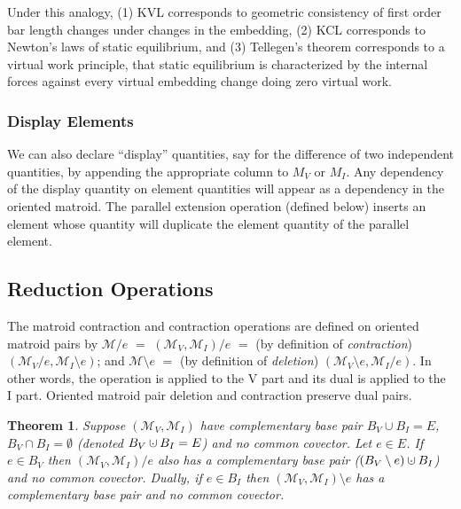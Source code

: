 \documentclass{amsproc-sunycstr}
\theoremstyle{plain}
\newtheorem{theorem}{Theorem}
\theoremstyle{definition}
\theoremstyle{remark}
\newcommand{\dunion}
{\mbox{\hbox{\hskip4pt$\cdot$\hskip-4.62pt$\cup$\hskip2pt}}}
\begin{document}
Under this analogy, 
(1) KVL corresponds to geometric consistency of first order
bar length changes under changes in the embedding, (2) KCL corresponds to
Newton's laws of static equilibrium, and (3) Tellegen's theorem corresponds
to a virtual work principle, that static equilibrium is
characterized by 
the internal forces against every virtual embedding change 
doing zero virtual work.

\subsubsection{Display Elements}
We can also declare ``display'' quantities, say for the difference of two
independent quantities, by appending the appropriate column to $M_V$ or
$M_I$.  Any dependency of the display quantity on element quantities will
appear as a dependency in the oriented matroid.  The parallel extension 
operation (defined below) inserts an element whose quantity will duplicate
the element quantity of the parallel element.




\subsection{Reduction Operations}
The matroid contraction and contraction operations are defined on oriented
matroid pairs by $\mathcal{M}/e$ $=$ $(\mathcal{M}_V,\mathcal{M}_I)/e$
$=$ (by definition of \textit{contraction}) 
$(\mathcal{M}_V/e,\mathcal{M}_I\setminus e)$;
and 
$\mathcal{M}\setminus e$ 
$=$ (by definition of \textit{deletion}) 
$(\mathcal{M}_V\setminus e,\mathcal{M}_I/ e)$.
In other words, the operation is applied to the V part and its dual is applied
to the I part.  Oriented matroid pair deletion and contraction preserve
dual pairs.

\begin{theorem}
\label{NoCCMinors}
Suppose $(\mathcal{M}_V,\mathcal{M}_I)$ have complementary base pair 
$B_V \cup B_I=E$, $B_V \cap B_I=\emptyset$ 
(denoted $B_V \dunion B_I=E$)
and no
common covector.  Let $e\in E$.
If $e\in B_V$ then $(\mathcal{M}_V,\mathcal{M}_I)/e$
also has a complementary base pair 
($(B_V\setminus e) \dunion B_I$) and no common covector.
Dually, if $e\in B_I$ 
then $(\mathcal{M}_V,\mathcal{M}_I)\setminus e$ has a complementary base pair
and no common covector.
\end{theorem}
\end{document}
